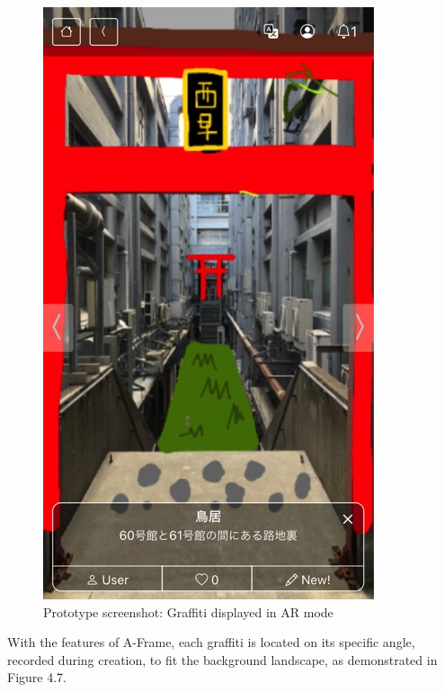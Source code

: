 \begin{figure}
\begin{minipage}{0.32\textwidth}
    \includegraphics[width=0.9\linewidth]{resources/4_methodology/prototype_graffiti.png}
      \caption{Prototype screenshot: Graffiti displayed in AR mode}
  \end{minipage}
\end{figure}

With the features of A-Frame, each graffiti is located on its specific angle, recorded during creation, to fit the background landscape, as demonstrated in Figure 4.7.

